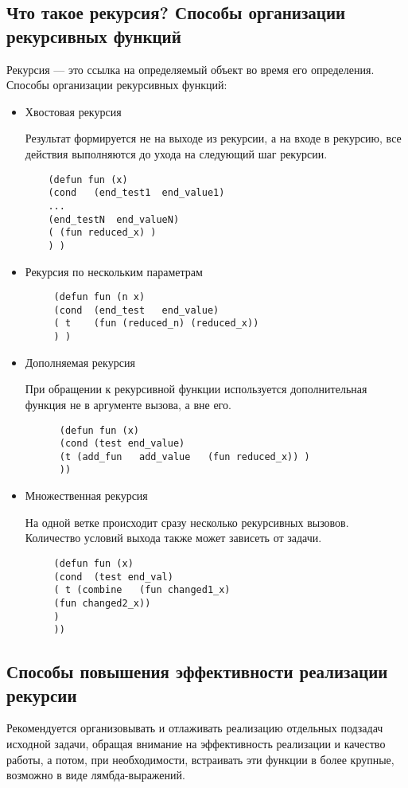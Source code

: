 \documentclass[a4paper,12pt]{article}
\begin{document}
\subsection*{Что такое рекурсия? Способы организации рекурсивных функций}

Рекурсия — это ссылка на определяемый объект во время его определения.
Способы организации рекурсивных функций:
\begin{itemize}
	\item Хвостовая рекурсия
	
	Результат формируется не на выходе из рекурсии, а на входе в рекурсию, все действия выполняются до ухода на следующий шаг рекурсии.
	\begin{lstlisting}
	(defun fun (x)
	(cond	(end_test1	end_value1)
	...
	(end_testN	end_valueN)
	( (fun reduced_x) )
	) )
	\end{lstlisting}
	 \item Рекурсия по нескольким параметрам
	 \begin{lstlisting}
	 (defun fun (n x)
	 (cond	(end_test	end_value)
	 ( t	(fun (reduced_n) (reduced_x))
	 ) )
	 \end{lstlisting}
	 \item Дополняемая рекурсия
	 
	  При обращении к рекурсивной функции используется дополнительная функция не в аргументе вызова, а вне его.
	  \begin{lstlisting}
	  (defun fun (x)
	  (cond	(test end_value)
	  (t (add_fun	add_value	(fun reduced_x)) )
	  ))
	 \end{lstlisting}
	 
	 \item Множественная рекурсия
	 
	 На одной ветке происходит сразу несколько рекурсивных вызовов. Количество условий выхода также может зависеть от задачи.
	 \begin{lstlisting}
	 (defun fun (x)
	 (cond	(test end_val)
	 ( t (combine	(fun changed1_x)
	 (fun changed2_x))
	 )
	 ))
	 \end{lstlisting}
\end{itemize}

\subsection*{Способы повышения эффективности реализации рекурсии}

Рекомендуется организовывать и отлаживать реализацию отдельных подзадач исходной задачи, обращая внимание на эффективность реализации и качество работы, а потом, при необходимости, встраивать эти функции в более крупные, возможно в виде  лямбда-выражений.
\end{document}
